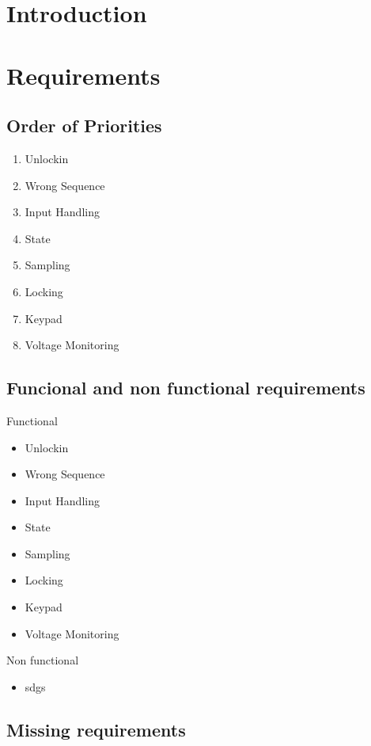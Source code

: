 \section*{Introduction}


\section{Requirements}

	\subsection{Order of Priorities}
		
		\begin{enumerate}
			\item Unlockin
			\item Wrong Sequence
			\item Input Handling
			\item State
			\item Sampling
			\item Locking
			\item Keypad
			\item Voltage Monitoring
		\end{enumerate}
	
	
	\subsection{Funcional and non functional requirements}
	Functional	
		\begin{itemize}
			\item Unlockin
			\item Wrong Sequence
			\item Input Handling
			\item State
			\item Sampling
			\item Locking
			\item Keypad
			\item Voltage Monitoring
		\end{itemize}
	Non functional
		\begin{itemize}
			\item sdgs
		\end{itemize}

	\subsection{Missing requirements}


